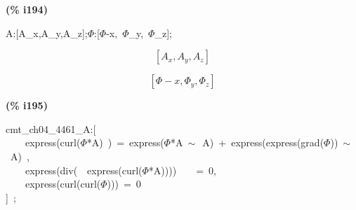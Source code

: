 \documentclass[fleqn]{article}
\begin{document}
\noindent
\begin{minipage}[t]{4.000000em}\color{red}\bfseries
(\% i194)	
\end{minipage}
\begin{minipage}[t]{\textwidth}\color{blue}
A:[A\_x,A\_y,A\_z];\ensuremath{\Phi}:[\ensuremath{\Phi}-x,\ \ensuremath{\Phi}\_y,\ \ensuremath{\Phi}\_z];
\end{minipage}
\[\displaystyle \tag{\% o193} 
\left[ {A_x}\operatorname{,}{A_y}\operatorname{,}{A_z}\right] \mbox{}\]

\[\tag{\% o194} 
\left[ \Phi -x\operatorname{,}{{\Phi }_y}\operatorname{,}{{\Phi }_z}\right] \mbox{}
\]


\noindent
\begin{minipage}[t]{4.000000em}\color{red}\bfseries
(\% i195)	
\end{minipage}
\begin{minipage}[t]{\textwidth}\color{blue}
cmt\_ch04\_4461\_A:[\\
\ \ \ \ express(curl(\ensuremath{\Phi}*A)\ )\ =\ express(\ensuremath{\Phi}*A\ \ensuremath{\sim\ }\ A)\ +\ express(express(grad(\ensuremath{\Phi}))\ \ensuremath{\sim\ }\ A)\ ,\\
\ \ \ \ express(div(\ \ express(curl(\ensuremath{\Phi}*A))))\ \ \ \ =\ 0,\\
\ \ \ \ express(curl(curl(\ensuremath{\Phi})))\ =\ 0\\
]\ ;
\end{minipage}
\end{document}
